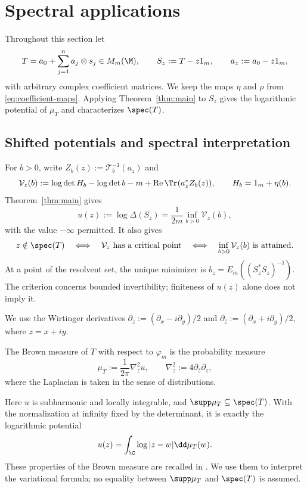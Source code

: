 \section{Spectral applications}\label{sec:spectral}

Throughout this section let
\[
 T=a_0+\sum_{j=1}^n a_j\otimes s_j\in M_m(\M),\qquad
 S_z:=T-z1_m,\qquad a_z:=a_0-z1_m,
\]
with arbitrary complex coefficient matrices.
We keep the maps $\eta$ and $\rho$ from \eqref{eq:coefficient-maps}.
Applying Theorem~\ref{thm:main} to $S_z$ gives the logarithmic potential of $\mu_T$ and characterizes $\spec(T)$.

\subsection{Shifted potentials and spectral interpretation}
For $b>0$, write $Z_b(z):=\mathcal T_b^{-1}(a_z)$ and
\[
 \mathcal V_z(b):=\log\det H_b-\log\det b-m
                   +\operatorname{Re}\Tr(a_z^*Z_b(z)),
 \qquad H_b=1_m+\eta(b).
\]
Theorem~\ref{thm:main} gives
\begin{equation}\label{eq:shifted-potential}
 u(z):=\log\Delta(S_z)=\frac1{2m}\inf_{b>0}\mathcal V_z(b),
\end{equation}
with the value $-\infty$ permitted.
It also gives
\begin{equation}\label{eq:full-spectrum}
 z\notin\spec(T)
 \quad\Longleftrightarrow\quad
 \mathcal V_z\text{ has a critical point}
 \quad\Longleftrightarrow\quad
 \inf_{b>0}\mathcal V_z(b)\text{ is attained}.
\end{equation}
At a point of the resolvent set, the unique minimizer is $b_z=E_m((S_z^*S_z)^{-1})$.
The criterion concerns bounded invertibility; finiteness of $u(z)$ alone does not imply it.

We use the Wirtinger derivatives $\partial_z:=(\partial_x-i\partial_y)/2$ and $\partial_{\bar z}:=(\partial_x+i\partial_y)/2$, where $z=x+iy$.
\begin{definition}\label{def:brown}\label{def:brown-measure}
The Brown measure of $T$ with respect to $\varphi_m$ is the probability measure
\begin{equation}\label{eq:brown-definition}
 \mu_T:=\frac1{2\pi}\nabla_z^2u,\qquad
 \nabla_z^2:=4\partial_{\bar z}\partial_z,
\end{equation}
where the Laplacian is taken in the sense of distributions.
\end{definition}
Here $u$ is subharmonic and locally integrable, and $\supp\mu_T\subseteq\spec(T)$.
With the normalization at infinity fixed by the determinant, it is exactly the logarithmic potential
\begin{equation}\label{eq:brown-logarithmic-potential}
 u(z)=\int_{\C}\log|z-w|\dd\mu_T(w).
\end{equation}
These properties of the Brown measure are recalled in \cite[Chapter 11, Theorem 5, Definition 6 and (11.6)--(11.8)]{MS17}.
We use them to interpret the variational formula; no equality between $\supp\mu_T$ and $\spec(T)$ is assumed.

